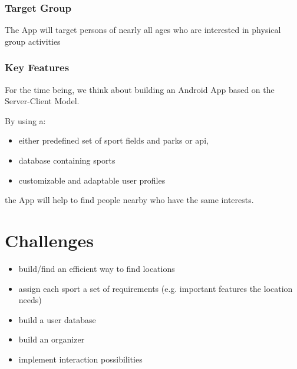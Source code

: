 \documentclass[aspectratio=169]{beamer}
\begin{document}
\begin{frame}   
\frametitle{Target Group}
The App will target persons of nearly all ages who are interested in physical group activities
\end{frame}


\begin{frame}
\frametitle{Key Features}
For the time being, we think about building an Android App based on the Server-Client Model.

By using a:
\begin{itemize}
	\item either predefined set of sport fields and parks or api,
	\item database containing sports 
	\item customizable and adaptable user profiles 
\end{itemize}
 the App will help to find people nearby who have the same interests.
\end{frame}

\section{Challenges}
\begin{frame}
	\begin{itemize}
		\item build/find an efficient way to find locations
		\item assign each sport a set of requirements (e.g. important features the location needs)
		\item build a user database
		\item build an organizer 
		\item implement interaction possibilities
	\end{itemize}
\end{frame}
\end{document}
